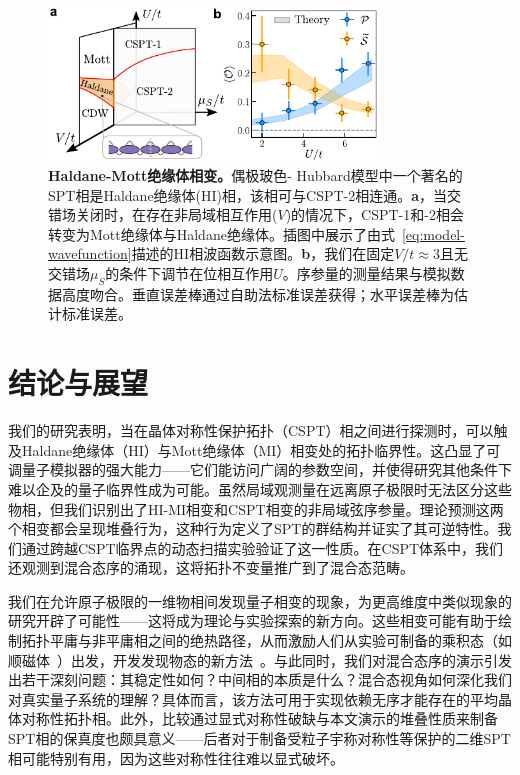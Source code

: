 \documentclass[preprint,superscriptaddress,floatfix, nofootinbib]{revtex4-2}
\begin{document}
\begin{figure}
    \centering
    \includegraphics[width=247pt]{figures/Fig_Haldane_V3.pdf}
    \caption{\textbf{Haldane-Mott绝缘体相变。}偶极玻色- Hubbard模型中一个著名的SPT相是Haldane绝缘体(HI)相，该相可与CSPT-2相连通。\textbf{a}，当交错场关闭时，在存在非局域相互作用($V$)的情况下，CSPT-1和-2相会转变为Mott绝缘体与Haldane绝缘体。插图中展示了由式~\eqref{eq:model-wavefunction}描述的HI相波函数示意图。\textbf{b}，我们在固定$V/t\approx3$且无交错场$\mu_S$的条件下调节在位相互作用$U$。序参量的测量结果与模拟数据高度吻合。垂直误差棒通过自助法标准误差获得；水平误差棒为估计标准误差。}
    \label{fig: HI}
\end{figure}
\section{结论与展望}

我们的研究表明，当在晶体对称性保护拓扑（CSPT）相之间进行探测时，可以触及Haldane绝缘体（HI）与Mott绝缘体（MI）相变处的拓扑临界性。这凸显了可调量子模拟器的强大能力——它们能访问广阔的参数空间，并使得研究其他条件下难以企及的量子临界性成为可能。虽然局域观测量在远离原子极限时无法区分这些物相，但我们识别出了HI-MI相变和CSPT相变的非局域弦序参量。理论预测这两个相变都会呈现堆叠行为，这种行为定义了SPT的群结构并证实了其可逆特性。我们通过跨越CSPT临界点的动态扫描实验验证了这一性质。在CSPT体系中，我们还观测到混合态序的涌现，这将拓扑不变量推广到了混合态范畴。

我们在允许原子极限的一维物相间发现量子相变的现象，为更高维度中类似现象的研究开辟了可能性——这将成为理论与实验探索的新方向。这些相变可能有助于绘制拓扑平庸与非平庸相之间的绝热路径，从而激励人们从实验可制备的乘积态（如顺磁体~\cite{Scholl2021, Ebadi2021}）出发，开发发现物态的新方法~\cite{Semeghini2021}。与此同时，我们对混合态序的演示引发出若干深刻问题：其稳定性如何？中间相的本质是什么？混合态视角如何深化我们对真实量子系统的理解？具体而言，该方法可用于实现依赖无序才能存在的平均晶体对称性拓扑相\cite{Ma23_b,intrinsicACSPT}。此外，比较通过显式对称性破缺与本文演示的堆叠性质来制备SPT相的保真度也颇具意义——后者对于制备受粒子宇称对称性等保护的二维SPT相可能特别有用\cite{LevinGu}，因为这些对称性往往难以显式破坏。
\end{document}
